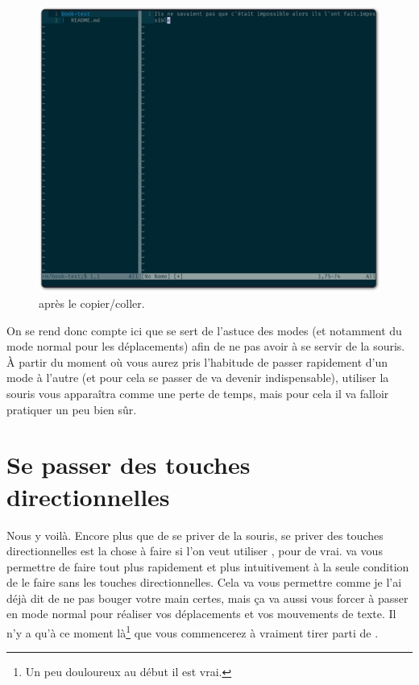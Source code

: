 \begin{figure}%
  \includegraphics[width=\linewidth]{graphics/vim-paste.png}
  \caption{\vim après le copier/coller.}
  \label{fig:vim-paste}
\end{figure}

On se rend donc compte ici que \vim se sert de l'astuce des modes (et notamment du mode \og normal \fg{} pour les déplacements) afin de ne pas avoir à se servir de la souris.
À partir du moment où vous aurez pris l'habitude de passer rapidement d'un mode à l'autre (et pour cela se passer de \ttesc va devenir indispensable), utiliser la souris vous apparaîtra comme une perte de temps, mais pour cela il va falloir pratiquer un peu bien sûr.


\section{Se passer des touches directionnelles}\label{sec:se-passer-touches-dir}

Nous y voilà. Encore plus que de se priver de la souris, se priver des touches directionnelles est la chose à faire si l'on veut utiliser \vim, pour de vrai. \vim va vous permettre de faire tout plus rapidement et plus intuitivement à la seule condition de le faire sans les touches directionnelles.
Cela va vous permettre comme je l'ai déjà dit de ne pas bouger votre main certes, mais ça va aussi vous forcer à passer en mode \og normal \fg{} pour réaliser vos déplacements et vos mouvements de texte. Il n'y a qu'à ce moment là\footnote{Un peu douloureux au début il est vrai.} que vous commencerez à vraiment tirer parti de \vim.

